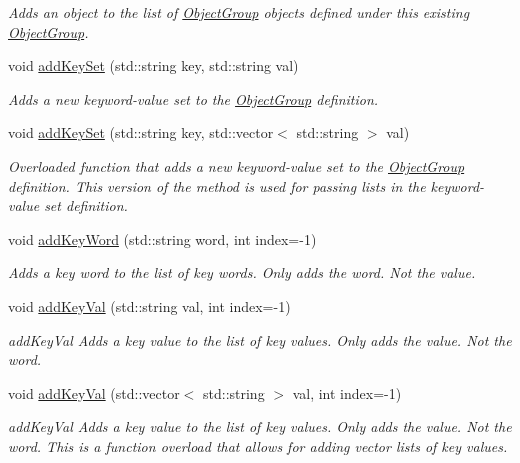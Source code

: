 \begin{DoxyCompactItemize}
\begin{DoxyCompactList}\small\item\em Adds an object to the list of \hyperlink{classosea_1_1_object_group}{Object\-Group} objects defined under this existing \hyperlink{classosea_1_1_object_group}{Object\-Group}. \end{DoxyCompactList}\item 
void \hyperlink{classosea_1_1_object_group_a83f133e49aa52b4b649872def6d77260}{add\-Key\-Set} (std\-::string key, std\-::string val)
\begin{DoxyCompactList}\small\item\em Adds a new keyword-\/value set to the \hyperlink{classosea_1_1_object_group}{Object\-Group} definition. \end{DoxyCompactList}\item 
void \hyperlink{classosea_1_1_object_group_a6cd45569ea88e9363894e1c14d8ed09b}{add\-Key\-Set} (std\-::string key, std\-::vector$<$ std\-::string $>$ val)
\begin{DoxyCompactList}\small\item\em Overloaded function that adds a new keyword-\/value set to the \hyperlink{classosea_1_1_object_group}{Object\-Group} definition. This version of the method is used for passing lists in the keyword-\/value set definition. \end{DoxyCompactList}\item 
void \hyperlink{classosea_1_1_object_group_a8bd69589a25fe6a666ae71e926c0a9d0}{add\-Key\-Word} (std\-::string word, int index=-\/1)
\begin{DoxyCompactList}\small\item\em Adds a key word to the list of key words. Only adds the word. Not the value. \end{DoxyCompactList}\item 
void \hyperlink{classosea_1_1_object_group_a7340f605d054830056666531e748093a}{add\-Key\-Val} (std\-::string val, int index=-\/1)
\begin{DoxyCompactList}\small\item\em add\-Key\-Val Adds a key value to the list of key values. Only adds the value. Not the word. \end{DoxyCompactList}\item 
void \hyperlink{classosea_1_1_object_group_ac8f27751c5a2a53c23b6333d69fae28b}{add\-Key\-Val} (std\-::vector$<$ std\-::string $>$ val, int index=-\/1)
\begin{DoxyCompactList}\small\item\em add\-Key\-Val Adds a key value to the list of key values. Only adds the value. Not the word. This is a function overload that allows for adding vector lists of key values. \end{DoxyCompactList}\item 

\end{DoxyCompactItemize}
